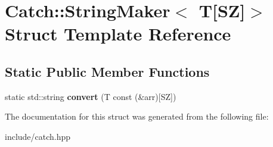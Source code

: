 \hypertarget{structCatch_1_1StringMaker_3_01T[SZ]_4}{}\section{Catch\+:\+:String\+Maker$<$ T\mbox{[}SZ\mbox{]}$>$ Struct Template Reference}
\label{structCatch_1_1StringMaker_3_01T[SZ]_4}
\subsection*{Static Public Member Functions}
\begin{DoxyCompactItemize}
\item 
static std\+::string {\bfseries convert} (T const (\&arr)\mbox{[}SZ\mbox{]})\hypertarget{structCatch_1_1StringMaker_3_01T[SZ]_4_ab10ef3c2111d6faa2ed2f23a1e00c29a}{}\label{structCatch_1_1StringMaker_3_01T[SZ]_4_ab10ef3c2111d6faa2ed2f23a1e00c29a}

\end{DoxyCompactItemize}


The documentation for this struct was generated from the following file\+:\begin{DoxyCompactItemize}
\item 
include/catch.\+hpp\end{DoxyCompactItemize}
